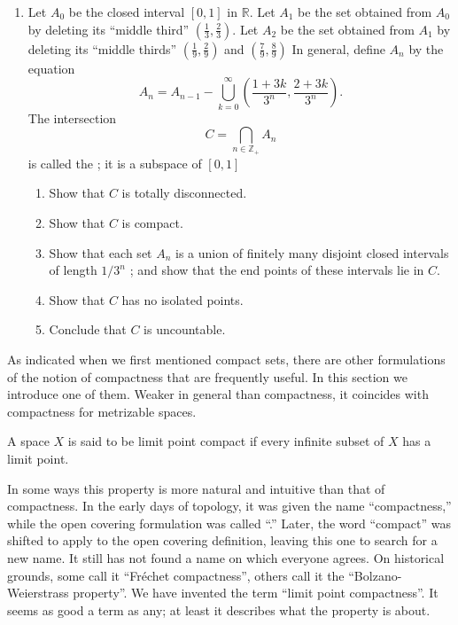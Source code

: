 \begin{enumerate}[itemsep=0.4em, parsep=0pt, topsep=0pt, partopsep=0pt, leftmargin=*, label=\arabic*., ref=\arabic*]
\item Let \(A_{0}\) be the closed interval \([ {0,1}]\) in \(\mathbb{R}\). Let \(A_{1}\) be the set obtained from \(A_{0}\) by deleting its ``middle third'' \(( {\frac{1}{3},\frac{2}{3}})\). Let \(A_{2}\) be the set obtained from \(A_{1}\) by deleting its ``middle thirds'' \(( {\frac{1}{9},\frac{2}{9}})\) and \(( {\frac{7}{9},\frac{8}{9}})\) In general, define \(A_{n}\) by the equation \[ A_{n} = A_{n - 1} - \mathop{\bigcup }\limits_{{k = 0}}^{\infty }( {\frac{1 + {3k}}{3^{n}},\frac{2 + {3k}}{3^{n}}}). \] The intersection \[ C = \mathop{\bigcap }\limits_{{n \in {\mathbb{Z}}_{ + }}}A_{n} \] is called the ; it is a subspace of \([ {0,1}]\)
 \begin{enumerate}[itemsep=0.2em, parsep=0pt, topsep=0pt, partopsep=0pt, leftmargin=*, label=(\alph*), align=left]
 \item Show that \(C\) is totally disconnected.
 \item Show that \(C\) is compact.
 \item Show that each set \(A_{n}\) is a union of finitely many disjoint closed intervals of length \(1/3^{n}\) ; and show that the end points of these intervals lie in \(C\).
 \item Show that \(C\) has no isolated points.
 \item Conclude that \(C\) is uncountable.
 \end{enumerate}
\end{enumerate}

As indicated when we first mentioned compact sets, there are other formulations of the notion of compactness that are frequently useful. In this section we introduce one of them. Weaker in general than compactness, it coincides with compactness for metrizable spaces.

\begin{definition}
 A space \(X\) is said to be limit point compact if every infinite subset of \(X\) has a limit point.
\end{definition}

In some ways this property is more natural and intuitive than that of compactness. In the early days of topology, it was given the name ``compactness,'' while the open covering formulation was called ``.'' Later, the word ``compact'' was shifted to apply to the open covering definition, leaving this one to search for a new name. It still has not found a name on which everyone agrees. On historical grounds, some call it ``Fréchet compactness'', others call it the ``Bolzano-Weierstrass property''. We have invented the term ``limit point compactness''. It seems as good a term as any; at least it describes what the property is about.

